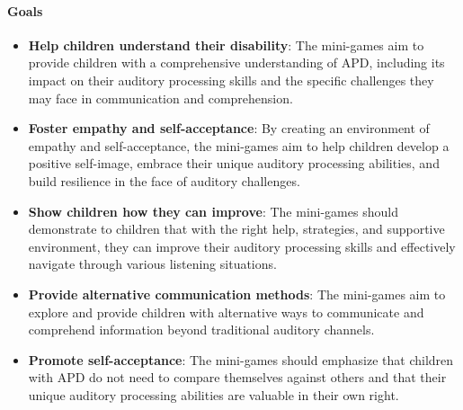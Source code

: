 \paragraph{Goals}
\begin{itemize}
    \item \textbf{Help children understand their disability}: The mini-games aim to provide children with a comprehensive understanding of APD, including its impact on their auditory processing skills and the specific challenges they may face in communication and comprehension.
    \item \textbf{Foster empathy and self-acceptance}: By creating an environment of empathy and self-acceptance, the mini-games aim to help children develop a positive self-image, embrace their unique auditory processing abilities, and build resilience in the face of auditory challenges.
    \item \textbf{Show children how they can improve}: The mini-games should demonstrate to children that with the right help, strategies, and supportive environment, they can improve their auditory processing skills and effectively navigate through various listening situations.
    \item \textbf{Provide alternative communication methods}: The mini-games aim to explore and provide children with alternative ways to communicate and comprehend information beyond traditional auditory channels.
    \item \textbf{Promote self-acceptance}: The mini-games should emphasize that children with APD do not need to compare themselves against others and that their unique auditory processing abilities are valuable in their own right.
\end{itemize}

